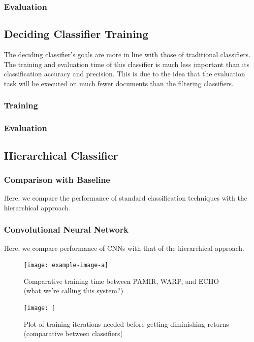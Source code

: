 \subsubsection{Evaluation}

\subsection{Deciding Classifier Training}
The deciding classifier's goals are more in line with those of traditional classifiers. The training and evaluation time of this classifier is much less important than its classification accuracy and precision. This is due to the idea that the evaluation task will be executed on much fewer documents than the filtering classifiers.

\subsubsection{Training}

\subsubsection{Evaluation}


\subsection{Hierarchical Classifier}

\subsubsection{Comparison with Baseline}
Here, we compare the performance of standard classification techniques with the hierarchical approach.

\subsubsection{Convolutional Neural Network}
Here, we compare performance of CNNs with that of the hierarchical approach.

\begin{figure}
    \centering
    \texttt{[image: example-image-a]}
    \caption{Comparative training time between PAMIR, WARP, and ECHO (what we're calling this system?)}
    \label{fig:my-label}
\end{figure}

\begin{figure}
    \centering
    \texttt{[image: ]}
    \caption{Plot of training iterations needed before getting diminishing returns (comparative between classifiers)}
    \label{fig:learning-curve}
\end{figure}

